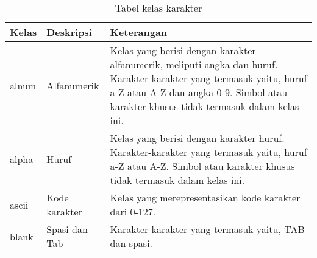 \begin{table}[H]
	\renewcommand{\arraystretch}{1.5}
	\caption {Tabel kelas karakter} \label{tab:character classes}
	\begin{center}
		\begin{tabular}{|p{2 cm}|>{\raggedright} p{5 cm}| p{7.5 cm}|}
		\hline
		Kelas & Deskripsi & Keterangan \\ 
		\hline 
		alnum & Alfanumerik & Kelas yang berisi dengan karakter alfanumerik, meliputi angka dan huruf. Karakter-karakter yang termasuk yaitu, huruf a-Z atau A-Z dan angka 0-9. Simbol atau karakter khusus tidak termasuk dalam kelas ini. \newline \\ 
		\hline 
		alpha & Huruf & Kelas yang berisi dengan karakter huruf. Karakter-karakter yang termasuk yaitu, huruf a-Z atau A-Z.	Simbol atau karakter khusus tidak termasuk dalam kelas ini. \newline \\ 
		\hline 
		ascii & Kode karakter & Kelas yang merepresentasikan kode karakter dari 0-127. \newline \\ 
		\hline 
		blank & Spasi dan Tab & Karakter-karakter yang termasuk yaitu, TAB dan spasi. \newline \\ 
		\hline 
		\end{tabular} 
	\end{center}
\end{table}

